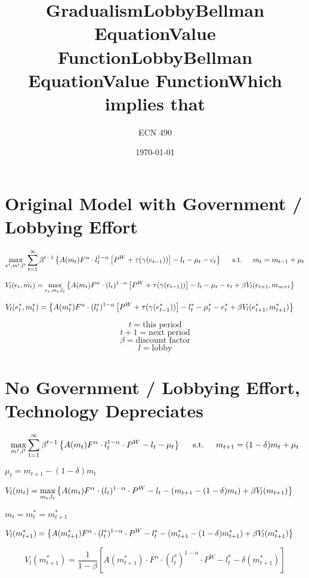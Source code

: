 \documentclass[12pt]{article}
\begin{document}
\title{\vskip-0.6in Gradualism}
\author{ECN 490}
\date{\today}
\maketitle


\section{Original Model with Government / Lobbying Effort}
\title{Lobby}
\[
\max_{e^t,m^t,l^t} \sum_{t=1}^\infty \beta^{t-1}\left\{A(m_t)F^\alpha\cdot l^{1-\alpha}_t\left[P^W+\tau(\gamma(e_{t-1}))\right]-l_t-\mu_t-e_t
  \right\} \hskip.2in \text{s.t.} \hskip.2in  m_t=m_{t-1}+\mu_t
\]

 
\title{Bellman Equation}
\[
  V_l(e_t,m_t)=\max_{e_t,m_t,l_t}\left\{A(m_t)F^\alpha\cdot (l_t)^{1-\alpha}\left[P^W+\tau(\gamma(e_{t-1}))\right]-l_t-\mu_t-e_t+\beta V_l(e_{t+1},m_{m+t}
  \right\} \hskip.2in 
\]
\title{Value Function}
\[
  V_l(e_t^\ast,m_t^\ast)=\left\{A(m_t^\ast)F^\alpha\cdot (l^\ast_t)^{1-\alpha}\left[P^W+\tau(\gamma(e_{t-1}^\ast))\right]-l_t^\ast-\mu_t^\ast-e_t^\ast+\beta V_l(e^\ast_{t+1},m^\ast_{t+1})
  \right\} \hskip.2in
\]

\[
t=\text{this period}
\]
\[
t+1=\text{next period}
\]
\[
\beta=\text{discount factor}
\]
\[
l=\text{lobby}
\]

\section{No Government / Lobbying Effort, Technology Depreciates}
\title{Lobby}
\[
\max_{m^t,l^t} \sum_{t=1}^\infty \beta^{t-1}\left\{A(m_t)F^\alpha\cdot l^{1-\alpha}_t\cdot P^W-l_t-\mu_t
  \right\} \hskip.2in \text{s.t.} \hskip.2in  m_{t+1}=(1-\delta)m_{t}+\mu_t
\]
\begin{center} $\mu_t=m_{t+1}-(1-\delta)m_{t}$\end{center}

\title{Bellman Equation}
\[
  V_l(m_t)=\max_{m_t,l_t}\left\{A(m_t)F^\alpha\cdot (l_t)^{1-\alpha}\cdot P^W-l_t-(m_{t+1}-(1-\delta)m_t)+\beta V_l(m_{t+1})
  \right\} \hskip.2in 
\]
\begin{center} $m_t=m_t^\ast=m^\ast_{t+1}$\end{center}
\title{Value Function}
\[
  V_l(m_{t+1}^\ast)=\left\{A(m_{t+1}^\ast)F^\alpha\cdot (l^\ast_t)^{1-\alpha}\cdot P^W-l_t^\ast-(m^\ast_{t+1}-(1-\delta)m^\ast_{t+1})+\beta V_l(m^\ast_{t+1})
 \right\} \hskip.2in
\]
\begin{center}\title{Which implies that}\end{center}
\[V_l(m_{t+1}^\ast)=\frac{1}{1-\beta}\left[ A(m_{t+1}^\ast)\cdot F^\alpha\cdot (l^\ast_t)^{1-\alpha}\cdot P^W-l^\ast_t-\delta(m^\ast_{t+1})\right]\]
 
\end{document}

